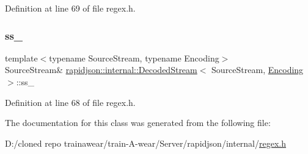 Definition at line 69 of file regex.\+h.

\mbox{\label{classrapidjson_1_1internal_1_1_decoded_stream_a3ea2b140a9dac55ea82ad7423454139f}} 
\subsubsection{\texorpdfstring{ss\_}{ss\_}}
{\footnotesize\ttfamily template$<$typename Source\+Stream, typename Encoding$>$ \\
Source\+Stream\& \mbox{\hyperlink{classrapidjson_1_1internal_1_1_decoded_stream}{rapidjson\+::internal\+::\+Decoded\+Stream}}$<$ Source\+Stream, \mbox{\hyperlink{classrapidjson_1_1_encoding}{Encoding}} $>$\+::ss\+\_\+\hspace{0.3cm}{\ttfamily [private]}}



Definition at line 68 of file regex.\+h.



The documentation for this class was generated from the following file\+:\begin{DoxyCompactItemize}
\item 
D\+:/cloned repo trainawear/train-\/\+A-\/wear/\+Server/rapidjson/internal/\mbox{\hyperlink{regex_8h}{regex.\+h}}\end{DoxyCompactItemize}
